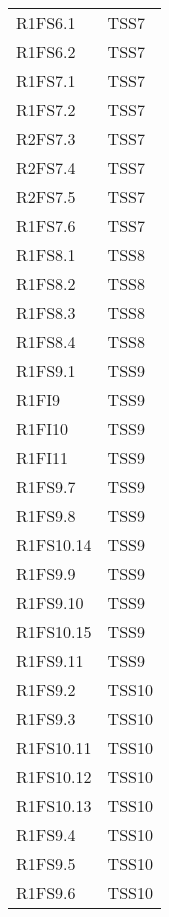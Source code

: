 {\begin{longtable}{C{4cm} C{4cm}}
R1FS6.1 & TSS7 \\
R1FS6.2 & TSS7 \\
R1FS7.1 & TSS7 \\
R1FS7.2 & TSS7 \\
R2FS7.3 & TSS7 \\
R2FS7.4 & TSS7 \\
R2FS7.5 & TSS7 \\
R1FS7.6 & TSS7 \\
R1FS8.1 & TSS8 \\
R1FS8.2 & TSS8 \\
R1FS8.3 & TSS8 \\
R1FS8.4 & TSS8 \\
R1FS9.1 & TSS9 \\
R1FI9 & TSS9 \\
R1FI10 & TSS9 \\
R1FI11 & TSS9 \\
R1FS9.7 & TSS9 \\
R1FS9.8 & TSS9 \\
R1FS10.14 & TSS9 \\
R1FS9.9 & TSS9 \\
R1FS9.10 & TSS9 \\
R1FS10.15 & TSS9 \\
R1FS9.11 & TSS9 \\
R1FS9.2 & TSS10 \\
R1FS9.3 & TSS10 \\
R1FS10.11 & TSS10 \\
R1FS10.12 & TSS10 \\
R1FS10.13 & TSS10 \\
R1FS9.4 & TSS10 \\
R1FS9.5 & TSS10 \\
R1FS9.6 & TSS10 \\

\end{longtable}
}























